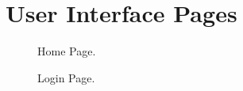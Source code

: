 \chapter{User Interface Pages}\label{UI}


\begin{figure}[h]
	\begin{center}
	\end{center}
	\caption{Home Page.}
\end{figure}

\begin{figure}[h]
	\begin{center}
	\end{center}
	\caption{Login Page.}
\end{figure}

